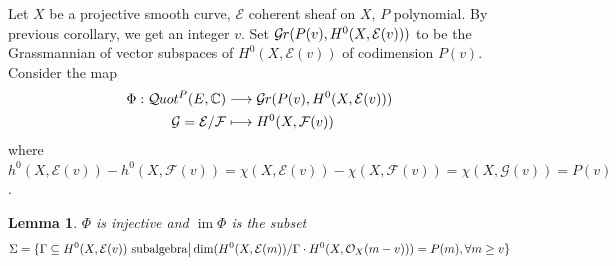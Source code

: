 \documentclass{ctexart}
\newtheorem{lemma}{Lemma}[section]
\newcommand{\im}{\operatorname{im}}
\newcommand{\grassmanmianfunctor}[2]{\mathcal{G}\kern -.5pt r(#1, #2)}
\newcommand{\quotfunctor}{\mathcal{Q}\kern -.5pt uot}
\begin{document}
Let $X$ be a projective smooth curve, $\mathcal{E}$ coherent sheaf on $X$, $P$ polynomial.
By previous corollary, we get an integer $v$.
Set $\grassmanmianfunctor{P(v)}{H^{0}(X, \mathcal{E}(v))}$ to be the Grassmannian of vector subspaces of $H^{0}(X, \mathcal{E}(v))$ of codimension $P(v)$.
Consider the map
\begin{equation}
    \begin{split}
        \Phi: \quotfunctor^{P}(E, \mathbb{C}) & \longrightarrow \grassmanmianfunctor{P(v)}{H^{0}(X, \mathcal{E}(v))} \\
        \mathcal{G} = \mathcal{E}/\mathcal{F} & \longmapsto H^{0}(X, \mathcal{F}(v))
    \end{split}
\end{equation}
where $h^{0}(X, \mathcal{E}(v)) - h^{0}(X, \mathcal{F}(v)) = \chi(X, \mathcal{E}(v)) - \chi(X, \mathcal{F}(v)) = \chi(X, \mathcal{G}(v)) = P(v)$. 
\begin{lemma}
    $\Phi$ is injective and $\im \Phi$ is the subset
    \begin{equation*}
        \Sigma = \{\Gamma \subseteq H^{0}(X, \mathcal{E}(v)) \text{ subalgebra} \big{|} \dim (H^{0}(X, \mathcal{E}(m))/\Gamma \cdot H^{0}(X, \mathcal{O}_{X}(m - v))) = P(m), \forall m \ge v\}
    \end{equation*}
    \vspace{-\baselineskip} %
    \label{Lemma 7.9}
\end{lemma}
\end{document}
